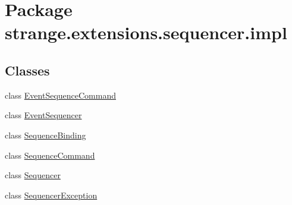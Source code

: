 \hypertarget{namespacestrange_1_1extensions_1_1sequencer_1_1impl}{\section{Package strange.\-extensions.\-sequencer.\-impl}
\label{namespacestrange_1_1extensions_1_1sequencer_1_1impl}
}
\subsection*{Classes}
\begin{DoxyCompactItemize}
\item 
class \hyperlink{classstrange_1_1extensions_1_1sequencer_1_1impl_1_1_event_sequence_command}{Event\-Sequence\-Command}
\item 
class \hyperlink{classstrange_1_1extensions_1_1sequencer_1_1impl_1_1_event_sequencer}{Event\-Sequencer}
\item 
class \hyperlink{classstrange_1_1extensions_1_1sequencer_1_1impl_1_1_sequence_binding}{Sequence\-Binding}
\item 
class \hyperlink{classstrange_1_1extensions_1_1sequencer_1_1impl_1_1_sequence_command}{Sequence\-Command}
\item 
class \hyperlink{classstrange_1_1extensions_1_1sequencer_1_1impl_1_1_sequencer}{Sequencer}
\item 
class \hyperlink{classstrange_1_1extensions_1_1sequencer_1_1impl_1_1_sequencer_exception}{Sequencer\-Exception}
\end{DoxyCompactItemize}

